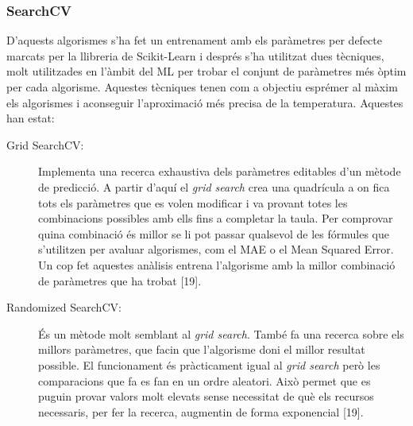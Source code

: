 \documentclass[10pt,a4paper,twocolumn,twoside]{article}
\begin{document}
\subsubsection{SearchCV}
D'aquests algorismes s'ha fet un entrenament amb els paràmetres per defecte marcats per la llibreria de Scikit-Learn i després s'ha utilitzat dues tècniques, molt utilitzades en l'àmbit del ML per trobar el conjunt de paràmetres més òptim per cada algorisme. Aquestes tècniques tenen com a objectiu esprémer al màxim els algorismes i aconseguir l'aproximació més precisa de la temperatura. Aquestes han estat:
\begin{description}
\item[Grid SearchCV:] Implementa una recerca exhaustiva dels paràmetres editables d'un mètode de predicció. A partir d'aquí el \textit{grid search} crea una quadrícula a on fica tots els paràmetres que es volen modificar i va provant totes les combinacions possibles amb ells fins a completar la taula. Per comprovar quina combinació és millor se li pot passar qualsevol de les fórmules que s'utilitzen per avaluar algorismes, com el MAE o el Mean Squared Error. Un cop fet aquestes anàlisis entrena l'algorisme amb la millor combinació de paràmetres que ha trobat [19].

\item[Randomized SearchCV:] És un mètode molt semblant al \textit{grid search}. També fa una recerca sobre els millors paràmetres, que facin que l'algorisme doni el millor resultat possible. El funcionament és pràcticament igual al \textit{grid search} però les comparacions que fa es fan en un ordre aleatori. Això permet que es puguin provar valors molt elevats sense necessitat de què els recursos necessaris, per fer la recerca, augmentin de forma exponencial [19].


\end{description}
\end{document}
